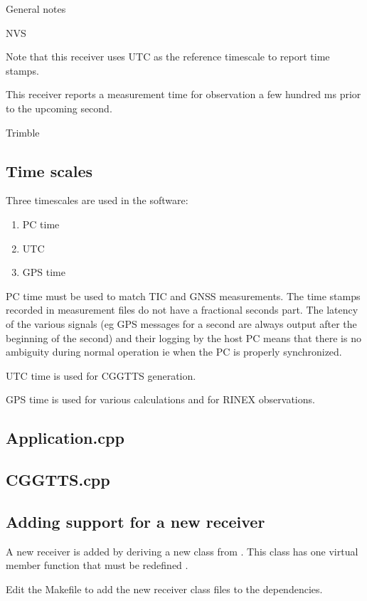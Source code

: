 
General notes

NVS

Note that this receiver uses UTC as the reference timescale to report time stamps.

This receiver reports a measurement time for observation a few hundred ms prior to the upcoming
second.

Trimble

 

\subsection{Time scales}

Three timescales are used in the software:
\begin{enumerate}
\item PC time
\item UTC
\item GPS time
\end{enumerate}

PC time must be used to match TIC and GNSS measurements. The time stamps recorded in measurement files do
not have a fractional seconds part. The latency of the various signals (eg GPS messages 
for a second are always output after the beginning of the second) and their logging by the host PC 
means that there is no ambiguity during normal operation ie when the PC is properly synchronized.

UTC time is used for CGGTTS generation.

GPS time is used for various calculations and for RINEX observations.

\subsection{Application.cpp}

\subsection{CGGTTS.cpp}


\subsection{Adding support for a new receiver}

A new receiver is added by deriving a new class from . This class has one virtual member
function that must be redefined .

Edit the Makefile to add the new receiver class files to the dependencies.

